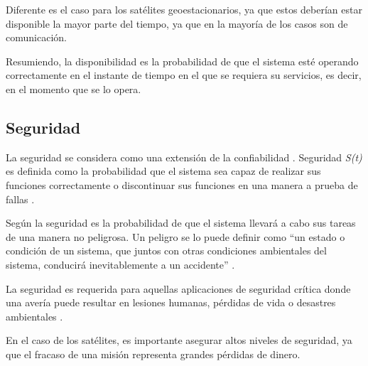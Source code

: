Diferente es el caso para los satélites geoestacionarios, ya que estos deberían estar disponible la
mayor parte del tiempo, ya que en la mayoría de los casos son de comunicación.

Resumiendo, la disponibilidad es la probabilidad de que el sistema esté operando correctamente en el instante de tiempo en el que se requiera su servicios, es decir, en el momento que se lo opera. 

\subsection{Seguridad}\label{subsec:seguridad}
La seguridad se considera como una extensión de la confiabilidad \citep{FTDesign}. Seguridad
\textit{S(t)} es definida como la probabilidad que el sistema sea capaz de realizar sus funciones
correctamente o discontinuar sus funciones en una manera a prueba de fallas \citep{FTDesign}.

Según \cite{SoftwareFaultToleranceATutorial} la seguridad es la probabilidad de que el sistema
llevará a cabo sus tareas de una manera no peligrosa. Un peligro se lo puede definir como ``un
estado o condición de un sistema, que juntos con otras condiciones ambientales del sistema,
conducirá inevitablemente a un accidente'' \citep{SoftwareFaultToleranceATutorial}.

La seguridad es requerida para aquellas aplicaciones de seguridad crítica donde una avería puede
resultar en lesiones humanas, pérdidas de vida o desastres ambientales \citep{FTDesign}.

En el caso de los satélites, es importante asegurar altos niveles de seguridad, ya que
el fracaso de una misión representa grandes pérdidas de dinero. 
